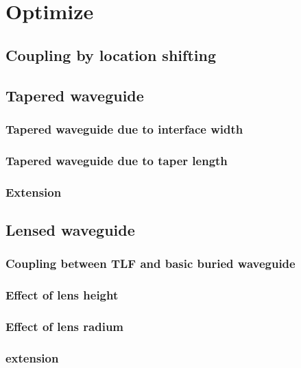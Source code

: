 \chapter{Optimize}

\section{Coupling by location shifting}

\section{Tapered waveguide}

\subsection{Tapered waveguide due to interface width} 

\subsection{Tapered waveguide due to taper length}

\subsection{Extension}

\section{Lensed waveguide}

\subsection{Coupling between TLF and basic buried waveguide}

\subsection{Effect of lens height}


\subsection{Effect of lens radium}

\subsection{extension}




